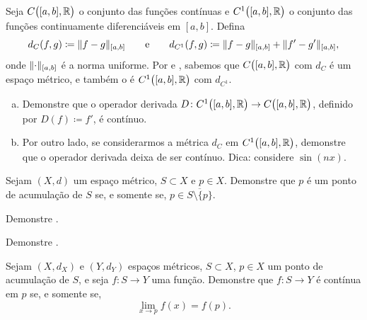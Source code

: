 \begin{samepage}
\begin{exercise}
Seja $C\bigl([a,b],{\mathbb{R}}\bigr)$ o conjunto das funções contínuas e
$C^1\bigl([a,b],{\mathbb{R}}\bigr)$ o conjunto das
funções continuamente diferenciáveis em $[a,b]$.
Defina
\begin{equation*}
d_{C}(f,g) \coloneqq \lVert {f-g} \rVert_{[a,b]}
\qquad \text{e} \qquad
d_{C^1}(f,g) \coloneqq \lVert {f-g} \rVert_{[a,b]} + \lVert {f'-g'} \rVert_{[a,b]},
\end{equation*}
onde $\lVert {\cdot} \rVert_{[a,b]}$ é a norma uniforme.
Por  e , sabemos que
$C\bigl([a,b],{\mathbb{R}}\bigr)$ com $d_C$ é um espaço métrico, e
também o é
$C^1\bigl([a,b],{\mathbb{R}}\bigr)$ com $d_{C^1}$.
\begin{enumerate}[a)]
\item
Demonstre que o operador derivada $D \colon 
C^1\bigl([a,b],{\mathbb{R}}\bigr) \to C\bigl([a,b],{\mathbb{R}}\bigr)$, definido por
$D(f) \coloneqq f'$, é contínuo.
\item
Por outro lado, se considerarmos a métrica $d_C$ em $C^1\bigl([a,b],{\mathbb{R}}\bigr)$,
demonstre que o operador derivada deixa de ser contínuo. Dica: considere
$\sin(n x)$.
\end{enumerate}
\end{exercise}
\end{samepage}

\begin{exercise}
Sejam $(X,d)$ um espaço métrico, $S \subset X$ e $p \in X$. Demonstre que
$p$ é um ponto de acumulação de $S$ se, e somente se, $p \in \overline{S \setminus \{
p \}}$.
\end{exercise}

\begin{exercise}
Demonstre .
\end{exercise}

\begin{exercise}
Demonstre .
\end{exercise}

\begin{exercise}
Sejam $(X,d_X)$ e $(Y,d_Y)$ espaços métricos, $S \subset X$, $p \in X$
um ponto de acumulação de $S$, e seja $f \colon S \to Y$ uma função.
Demonstre que
$f \colon S \to Y$ é contínua em $p$ se, e somente se,
\begin{equation*}
\lim_{x \to p} f(x) = f(p) .
\end{equation*}
\end{exercise}

